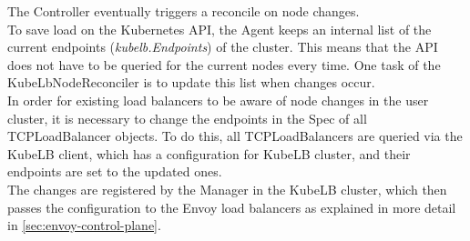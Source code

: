 The Controller eventually triggers a reconcile on node changes.
\\
To save load on the Kubernetes API, the Agent keeps an internal list of the current endpoints (\textit{kubelb.Endpoints}) of the cluster.
This means that the API does not have to be queried for the current nodes every time.
One task of the KubeLbNodeReconciler is to update this list when changes occur.
\\
In order for existing load balancers to be aware of node changes in the user cluster, it is necessary to change the endpoints in the Spec of all TCPLoadBalancer objects.
To do this, all TCPLoadBalancers are queried via the KubeLB client, which has a configuration for KubeLB cluster, and their endpoints are set to the updated ones.
\\
The changes are registered by the Manager in the KubeLB cluster, which then passes the configuration to the Envoy load balancers as explained in more detail in \autoref{sec:envoy-control-plane}.
\\
